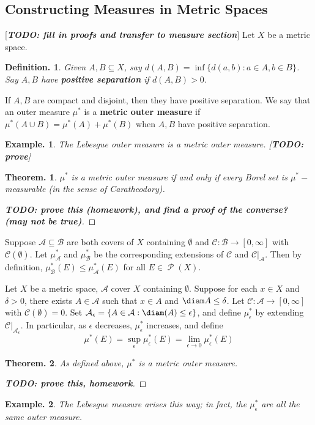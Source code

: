 \documentclass[11pt, a4paper]{memoir}
\theoremstyle{change}
\newtheorem{theorem}{Theorem.}[section]
\theoremstyle{plain}
\theoremstyle{nonumberplain}
\newtheorem{definition}{Definition.}
\newtheorem{example}{Example.}
\newtheorem{proof}{Proof}
\DeclareMathOperator{\ps}{{\mathcal{P}}}
\newcommand{\defn}[1]{{\boldmath\bfseries #1}}
\newcommand{\TODO}[1]{[\textit{\textbf{TODO: #1}}]}
\numberwithin{equation}{section}
\begin{document}
\subsection{Constructing Measures in Metric Spaces}
\TODO{fill in proofs and transfer to measure section}
Let $X$ be a metric space.
\begin{definition}
    Given $A,B\subseteq X$, say $d(A,B)=\inf\{d(a,b):a\in A,b\in B\}$.
    Say $A,B$ have \defn{positive separation} if $d(A,B)>0$.
\end{definition}
If $A,B$ are compact and disjoint, then they have positive separation.
We say that an outer measure $\mu^*$ is a \defn{metric outer measure} if $\mu^*(A\cup B)=\mu^*(A)+\mu^*(B)$ when $A,B$ have positive separation.
\begin{example}
    The Lebesgue outer measure is a metric outer measure.
    \TODO{prove}
\end{example}
\begin{theorem}
    $\mu^*$ is a metric outer measure if and only if every Borel set is $\mu^*-$measurable (in the sense of Caratheodory).
\end{theorem}
\begin{proof}
    \TODO{prove this (homework), and find a proof of the converse? (may not be true)}
\end{proof}
Suppose $\mathcal{A}\subseteq\mathcal{B}$ are both covers of $X$ containing $\emptyset$ and $\mathcal{C}:\mathcal{B}\to[0,\infty]$ with $\mathcal{C}(\emptyset)$.
Let $\mu^*_{\mathcal{A}}$ and $\mu^*_{\mathcal{B}}$ be the corresponding extensions of $\mathcal{C}$ and $\mathcal{C}|_{\mathcal{A}}$.
Then by definition, $\mu^*_{\mathcal{B}}(E)\leq\mu^*_{\mathcal{A}}(E)$ for all $E\in\ps(X)$.

Let $X$ be a metric space, $\mathcal{A}$ cover $X$ containing $\emptyset$.
Suppose for each $x\in X$ and $\delta>0$, there exists $A\in\mathcal{A}$ such that $x\in A$ and $\diam A\leq\delta$.
Let $\mathcal{C}:\mathcal{A}\to[0,\infty]$ with $\mathcal{C}(\emptyset)=0$.
Set $\mathcal{A}_\epsilon=\{A\in\mathcal{A}:\diam(A)\leq\epsilon\}$, and define $\mu^*_\epsilon$ by extending $\mathcal{C}|_{\mathcal{A}_\epsilon}$.
In particular, as $\epsilon$ decreases, $\mu^*_\epsilon$ increases, and define
\begin{equation*}
    \mu^*(E)=\sup_\epsilon\mu_\epsilon^*(E)=\lim_{\epsilon\to 0}\mu_\epsilon^*(E)
\end{equation*}
\begin{theorem}\label{t:metout}
    As defined above, $\mu^*$ is a metric outer measure.
\end{theorem}
\begin{proof}
    \TODO{prove this, homework}
\end{proof}
\begin{example}
    The Lebesgue measure arises this way; in fact, the $\mu_\epsilon^*$ are all the same outer measure.
\end{example}
\end{document}
